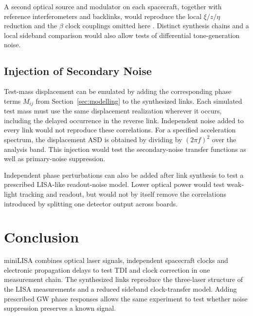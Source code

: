 \documentclass[aps,twocolumn,10pt,nofootinbib,floatfix]{revtex4-2}
\begin{document}
A second optical source and modulator on each spacecraft, together with reference interferometers and backlinks, would reproduce the local $\xi/z/\eta$ reduction and the $\beta$ clock couplings omitted here \cite{otto2012tdi}. Distinct synthesis chains and a local sideband comparison would also allow tests of differential tone-generation noise.


\subsection{Injection of Secondary Noise}
Test-mass displacement can be emulated by adding the corresponding phase terms $M_{ij}$ from Section~\ref{sec:modelling} to the synthesized links. Each simulated test mass must use the same displacement realization wherever it occurs, including the delayed occurrence in the reverse link. Independent noise added to every link would not reproduce these correlations. For a specified acceleration spectrum, the displacement ASD is obtained by dividing by $(2\pi f)^2$ over the analysis band. This injection would test the secondary-noise transfer functions as well as primary-noise suppression.

Independent phase perturbations can also be added after link synthesis to test a prescribed LISA-like readout-noise model. Lower optical power would test weak-light tracking and readout, but would not by itself remove the correlations introduced by splitting one detector output across boards.





\section{Conclusion}\label{Conclusion}
miniLISA combines optical laser signals, independent spacecraft clocks and electronic propagation delays to test TDI and clock correction in one measurement chain. The synthesized links reproduce the three-laser structure of the LISA measurements and a reduced sideband clock-transfer model. Adding prescribed GW phase responses allows the same experiment to test whether noise suppression preserves a known signal.
\end{document}

